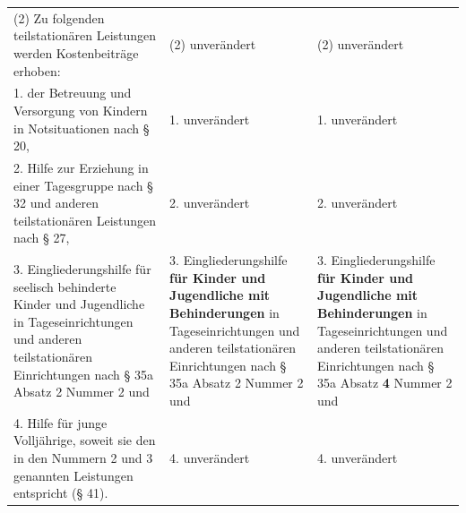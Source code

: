 \documentclass[10pt,a4paper,landscape]{article}
\begin{document}
\begin{longtable}{|L{8.2cm}|L{8.2cm}|L{8.2cm}|}
\hhline{|---|}
(2) Zu folgenden teilstationären Leistungen  \newline werden Kostenbeiträge erhoben: & (2) unverändert & (2) unverändert \\
\hhline{|---|}
1.   \newline der Betreuung und Versorgung von  \newline Kindern in Notsituationen nach \S{} 20, & 1. unverändert & 1. unverändert \\
\hhline{|---|}
2.   \newline Hilfe zur Erziehung in einer Tagesgruppe  \newline nach \S{} 32 und anderen teilstationären  \newline Leistungen nach \S{} 27, & 2. unverändert & 2. unverändert \\
\hhline{|---|}
3.   \newline Eingliederungshilfe für \textcolor{diffred}{seelisch behinderte}  \newline Kinder und Jugendliche in  \newline Tageseinrichtungen und anderen  \newline teilstationären Einrichtungen nach \S{} 35a  \newline Absatz \textcolor{diffred}{2} Nummer 2 und & 3.   \newline Eingliederungshilfe \textbf{für Kinder und  \newline Jugendliche mit Behinderungen} in  \newline Tageseinrichtungen und anderen  \newline teilstationären Einrichtungen nach \S{} 35a  \newline Absatz \textcolor{diffred}{2} Nummer 2 und & 3.   \newline Eingliederungshilfe \textbf{für Kinder und  \newline Jugendliche mit Behinderungen} in  \newline Tageseinrichtungen und anderen  \newline teilstationären Einrichtungen nach \S{} 35a  \newline Absatz \textbf{\textcolor{diffgreen}{4}} Nummer 2 und \\
\hhline{|---|}
4.   \newline Hilfe für junge Volljährige, soweit sie den in  \newline den Nummern 2 und 3 genannten  \newline Leistungen entspricht (\S{} 41). & 4. unverändert & 4. unverändert \\

\end{longtable}
\end{document}
